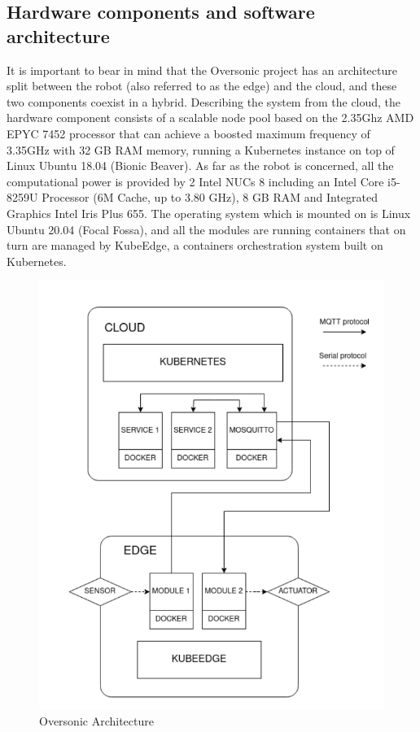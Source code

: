 \subsection{Hardware components and software architecture}
It is important to bear in mind that the Oversonic project has an architecture split between the
robot (also referred to as the edge) and the cloud, and these two components coexist in a
hybrid.
Describing the system from the cloud, the hardware component consists of a scalable node pool based on
the 2.35Ghz AMD EPYC 7452 processor that can achieve a boosted maximum frequency
of 3.35GHz with 32 GB RAM memory, running a Kubernetes instance on top of Linux
Ubuntu 18.04 (Bionic Beaver).
As far as the robot is concerned, all the computational power is provided by 2 Intel NUCs 8 including an Intel Core i5-8259U Processor (6M Cache, up to 3.80 GHz), 8 GB RAM and Integrated Graphics Intel Iris Plus 655.
The operating system which is mounted on is Linux Ubuntu 20.04 (Focal Fossa), and all the modules are running containers that on turn are managed by KubeEdge, a containers orchestration system built on Kubernetes.
\begin{figure}[H]
    \centering
    \includegraphics[scale=0.28]{Images/Chapter 3/oversonicarch.png}
    \caption{Oversonic Architecture}
    \label{fig:oversonicarch}
\end{figure}
